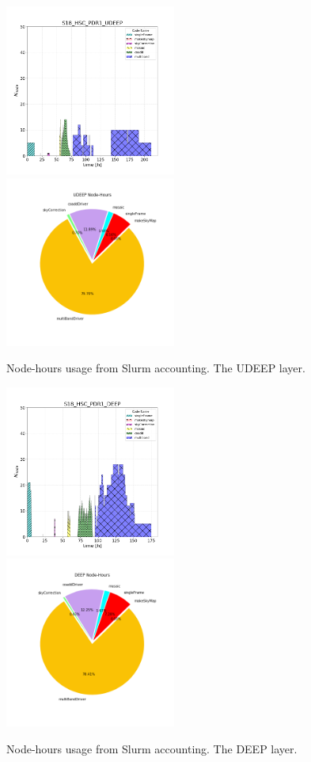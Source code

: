 \begin{figure}[ht]
    \includegraphics[width=0.50\textwidth]{usage-S18_HSC_PDR1_UDEEP.png}
    \includegraphics[width=0.50\textwidth]{PDR1_UDEEP_pie.png}
    \caption{Node-hours usage from Slurm accounting. The UDEEP layer.}
    \label{UDEEPslurm}
\end{figure}

\begin{figure}[ht]
    \includegraphics[width=0.50\textwidth]{usage-S18_HSC_PDR1_DEEP.png}
    \includegraphics[width=0.50\textwidth]{PDR1_DEEP_pie.png}
    \caption{Node-hours usage from Slurm accounting. The DEEP layer.}
    \label{DEEPslurm}
\end{figure}


